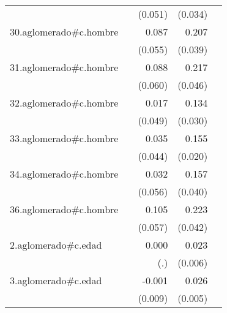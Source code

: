 {\begin{longtable}{l*{4}{D{.}{.}{-1}}}
            &                     &     (0.051)         &     (0.034)         &                     \\
\addlinespace
30.aglomerado#c.hombre&                     &       0.087         &       0.207\sym{***}&                     \\
            &                     &     (0.055)         &     (0.039)         &                     \\
\addlinespace
31.aglomerado#c.hombre&                     &       0.088         &       0.217\sym{***}&                     \\
            &                     &     (0.060)         &     (0.046)         &                     \\
\addlinespace
32.aglomerado#c.hombre&                     &       0.017         &       0.134\sym{***}&                     \\
            &                     &     (0.049)         &     (0.030)         &                     \\
\addlinespace
33.aglomerado#c.hombre&                     &       0.035         &       0.155\sym{***}&                     \\
            &                     &     (0.044)         &     (0.020)         &                     \\
\addlinespace
34.aglomerado#c.hombre&                     &       0.032         &       0.157\sym{***}&                     \\
            &                     &     (0.056)         &     (0.040)         &                     \\
\addlinespace
36.aglomerado#c.hombre&                     &       0.105         &       0.223\sym{***}&                     \\
            &                     &     (0.057)         &     (0.042)         &                     \\
\addlinespace
2.aglomerado#c.edad&                     &       0.000         &       0.023\sym{***}&                     \\
            &                     &         (.)         &     (0.006)         &                     \\
\addlinespace
3.aglomerado#c.edad&                     &      -0.001         &       0.026\sym{***}&                     \\
            &                     &     (0.009)         &     (0.005)         &                     \\

\end{longtable}}
